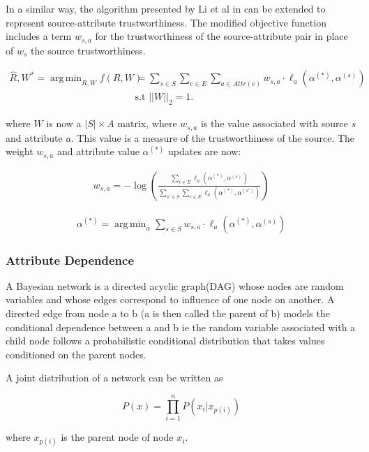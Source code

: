 \documentclass{acm_proc_article-sp}
\DeclareMathOperator*{\argmin}{arg\,min}
\begin{document}
In a similar way, the algorithm presented by Li et al in \cite{li:resolving} can be extended to represent source-attribute trustworthiness. The modified objective function includes a term $w_{s,a}$ for the trustworthiness of the source-attribute pair in place of $w_s$ the source trustworthiness. 

\begin{align}
\hat{R}, W^* = \argmin_{R,W} f(R, W) & = \sum_{s \in S} \sum_{e \in E} \sum_{a \in Attr(e)} w_{s,a} \cdot \ell_a(\alpha^{(*)}, \alpha^{(s)}) \\
& \text{s.t } ||W||_2 =1. \nonumber 
\end{align}

where  $W$ is now a $|S|\times A$ matrix, where $w_{s,a}$ is the value associated with source $s$ and attribute $a$. This value is a measure of the trustworthiness of the source. The weight $w_{s,a}$ and attribute value $\alpha^{(*)}$ updates are now: 


\begin{align}
w_{s,a} = - \log \left ( \frac{\sum_{e \in E} \ell_a(\alpha^{(*)}, \alpha^{(s)})}{\sum_{s' \in S} \sum_{e \in E}  \ell_a(\alpha^{(*)}, \alpha^{(s')})} \right )
\end{align}

\begin{align}
\alpha^{(*)} = \argmin_\alpha \sum_{s \in S} w_{s,a} \cdot \ell_a(\alpha^{(*)}, \alpha^{(s)})
\end{align}


\subsubsection{Attribute Dependence}

A Bayesian network is a directed acyclic graph(DAG) whose nodes are random variables and whose edges correspond to influence of one node on another. A directed edge from node a to b (a is then called the parent of b) models the conditional dependence between a and b ie the random variable associated with a child node follows a probabilistic conditional distribution that takes values conditioned on the parent nodes.

A joint distribution of a network can be written as 

\begin{equation}
P(x) = \prod_{i=1}^n P(x_i|x_{p(i)})
\end{equation}

where $x_{p(i)}$ is the parent node of node $x_i$.
\end{document}

